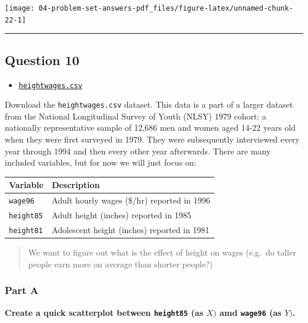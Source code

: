 \documentclass[
]{article}
\providecommand{\tightlist}{%
  \setlength{\itemsep}{0pt}\setlength{\parskip}{0pt}}
\begin{document}
\texttt{[image: 04-problem-set-answers-pdf\_files/figure-latex/unnamed-chunk-22-1]}

\begin{center}\rule{0.5\linewidth}{0.5pt}\end{center}

\hypertarget{question-10}{%
\subsection{Question 10}\label{question-10}}

\begin{itemize}
\tightlist
\item
  \href{http://metricsf21.classes.ryansafner.com/data/heightwages.csv}{
  \texttt{heightwages.csv}}
\end{itemize}

Download the \texttt{heightwages.csv} dataset. This data is a part of a
larger dataset from the National Longitudinal Survey of Youth (NLSY)
1979 cohort: a nationally representative sample of 12,686 men and women
aged 14-22 years old when they were first surveyed in 1979. They were
subsequently interviewed every year through 1994 and then every other
year afterwards. There are many included variables, but for now we will
just focus on:

\begin{longtable}[]{@{}ll@{}}
\toprule
Variable & Description \\
\midrule
\endhead
\texttt{wage96} & Adult hourly wages (\$/hr) reported in 1996 \\
\texttt{height85} & Adult height (inches) reported in 1985 \\
\texttt{height81} & Adolescent height (inches) reported in 1981 \\
\bottomrule
\end{longtable}

\begin{quote}
We want to figure out what is the effect of height on wages (e.g.~do
taller people earn more on average than shorter people?)
\end{quote}

\hypertarget{part-a-3}{%
\subsubsection{Part A}\label{part-a-3}}

\textbf{Create a quick scatterplot between \texttt{height85} (as \(X)\)
amd \texttt{wage96} (as \(Y)\).}
\end{document}
